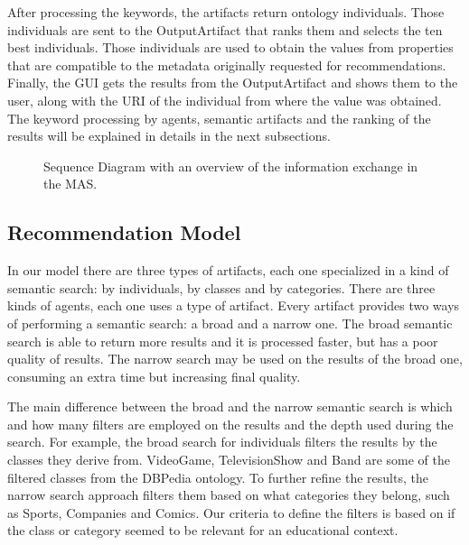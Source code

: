 \documentclass[a4paper,twoside]{article}
\begin{document}
After processing the keywords, the artifacts return ontology individuals. Those individuals are sent to the OutputArtifact that ranks them and selects the ten best individuals. Those individuals are used to obtain the values from properties that are compatible to the metadata originally requested for recommendations. Finally, the GUI gets the results from the OutputArtifact and shows them to the user, along with the URI of the individual from where the value was obtained. The keyword processing by agents, semantic artifacts and the ranking of the results will be explained in details in the next subsections.

\begin{figure*}[!h]
  \centering
   {}
  \caption{Sequence Diagram with an overview of the information exchange in the MAS.}
  \label{fig:exampleX}
 \end{figure*}
 
\subsection{Recommendation Model}

\noindent In our model there are three types of artifacts, each one specialized in a kind of semantic search: by individuals, by classes and by categories. There are three kinds of agents, each one uses a type of artifact. Every artifact provides two ways of performing a semantic search: a broad and a narrow one. The broad semantic search is able to return more results and it is processed faster, but has a poor quality of results. The narrow search may be used on the results of the broad one, consuming an extra time but increasing final quality.

The main difference between the broad and the narrow semantic search is which and how many filters are employed on the results and the depth used during the search. For example, the broad search for individuals filters the results by the classes they derive from. VideoGame,  TelevisionShow and Band are some of the filtered classes from the DBPedia ontology. To further refine the results, the narrow search approach filters them based on what categories they belong, such as Sports, Companies and Comics. Our criteria to define the filters is based on if the class or category seemed to be relevant for an educational context.
\end{document}
